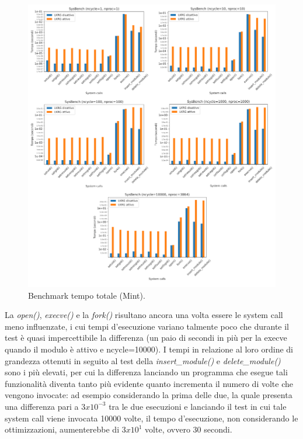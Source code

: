 \begin{figure}[!ht]
\centering
\includegraphics[scale=1.3]{Figures/Mint/Total}
\caption[Benchmark tempo totale (Mint)]{Benchmark tempo totale (Mint).}
\label{fig:totMintFig}
\end{figure}

La \emph{open()}, \emph{execve()} e la \emph{fork()} risultano ancora una volta essere le system call meno influenzate, i cui tempi d'esecuzione variano talmente poco che durante il test è quasi impercettibile la differenza (un paio di secondi in più per la execve quando il modulo è attivo e ncycle=10000). I tempi in relazione al loro ordine di grandezza ottenuti in seguito al test della \emph{insert\_module()} e \emph{delete\_module()} sono i più elevati, per cui la differenza lanciando un programma che esegue tali funzionalità diventa tanto più evidente quanto incrementa il numero di volte che vengono invocate: ad esempio considerando la prima delle due, la quale presenta una differenza pari a $3x10^{-3}$ tra le due esecuzioni e lanciando il test in cui tale system call viene invocata 10000 volte, il tempo d'esecuzione, non considerando le ottimizzazioni, aumenterebbe di $3x10^{1}$ volte, ovvero 30 secondi.

